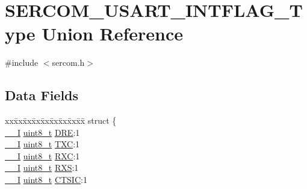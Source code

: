 \hypertarget{union_s_e_r_c_o_m___u_s_a_r_t___i_n_t_f_l_a_g___type}{}\section{S\+E\+R\+C\+O\+M\+\_\+\+U\+S\+A\+R\+T\+\_\+\+I\+N\+T\+F\+L\+A\+G\+\_\+\+Type Union Reference}
\label{union_s_e_r_c_o_m___u_s_a_r_t___i_n_t_f_l_a_g___type}


{\ttfamily \#include $<$sercom.\+h$>$}

\subsection*{Data Fields}
\begin{DoxyCompactItemize}
\item 
\begin{tabbing}
xx\=xx\=xx\=xx\=xx\=xx\=xx\=xx\=xx\=\kill
struct \{\\
\>\mbox{\hyperlink{core__cm0plus_8h_af63697ed9952cc71e1225efe205f6cd3}{\_\_I}} \mbox{\hyperlink{union_s_e_r_c_o_m___u_s_a_r_t___i_n_t_f_l_a_g___type_a5b4208c6f4c4a4290c4f2804d1eb1d5b}{uint8\_t}} \mbox{\hyperlink{union_s_e_r_c_o_m___u_s_a_r_t___i_n_t_f_l_a_g___type_a3e0c17296e30aaa4ad96a7effe9a00b0}{DRE}}:1\\
\>\mbox{\hyperlink{core__cm0plus_8h_af63697ed9952cc71e1225efe205f6cd3}{\_\_I}} \mbox{\hyperlink{union_s_e_r_c_o_m___u_s_a_r_t___i_n_t_f_l_a_g___type_a5b4208c6f4c4a4290c4f2804d1eb1d5b}{uint8\_t}} \mbox{\hyperlink{union_s_e_r_c_o_m___u_s_a_r_t___i_n_t_f_l_a_g___type_a79c6db23e2db2b1ff2aded896a392fb3}{TXC}}:1\\
\>\mbox{\hyperlink{core__cm0plus_8h_af63697ed9952cc71e1225efe205f6cd3}{\_\_I}} \mbox{\hyperlink{union_s_e_r_c_o_m___u_s_a_r_t___i_n_t_f_l_a_g___type_a5b4208c6f4c4a4290c4f2804d1eb1d5b}{uint8\_t}} \mbox{\hyperlink{union_s_e_r_c_o_m___u_s_a_r_t___i_n_t_f_l_a_g___type_a6a70680cf18df53069f66ae6df6506ff}{RXC}}:1\\
\>\mbox{\hyperlink{core__cm0plus_8h_af63697ed9952cc71e1225efe205f6cd3}{\_\_I}} \mbox{\hyperlink{union_s_e_r_c_o_m___u_s_a_r_t___i_n_t_f_l_a_g___type_a5b4208c6f4c4a4290c4f2804d1eb1d5b}{uint8\_t}} \mbox{\hyperlink{union_s_e_r_c_o_m___u_s_a_r_t___i_n_t_f_l_a_g___type_a39bb36a17d91822627c26724dd21ad31}{RXS}}:1\\
\>\mbox{\hyperlink{core__cm0plus_8h_af63697ed9952cc71e1225efe205f6cd3}{\_\_I}} \mbox{\hyperlink{union_s_e_r_c_o_m___u_s_a_r_t___i_n_t_f_l_a_g___type_a5b4208c6f4c4a4290c4f2804d1eb1d5b}{uint8\_t}} \mbox{\hyperlink{union_s_e_r_c_o_m___u_s_a_r_t___i_n_t_f_l_a_g___type_a12397a2bce28d5343249d4095f2570c6}{CTSIC}}:1\\

\end{tabbing}
\end{DoxyCompactItemize}
